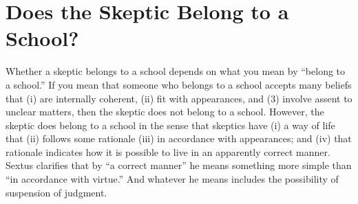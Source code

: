 \section*{Does the Skeptic Belong to a School?}

Whether a skeptic belongs to a school depends on what you mean by ``belong to a school.'' If you mean that someone who belongs to a school accepts many beliefs that (i) are internally coherent, (ii) fit with appearances, and (3) involve assent to unclear matters, then the skeptic does not belong to a school. However, the skeptic does belong to a school in the sense that skeptics have (i) a way of life that (ii) follows some rationale (iii) in accordance with appearances; and (iv) that rationale indicates how it is possible to live in an apparently correct manner. Sextus clarifies that by ``a correct manner'' he means something more simple than ``in accordance with virtue.'' And whatever he means includes the possibility of suspension of judgment.
